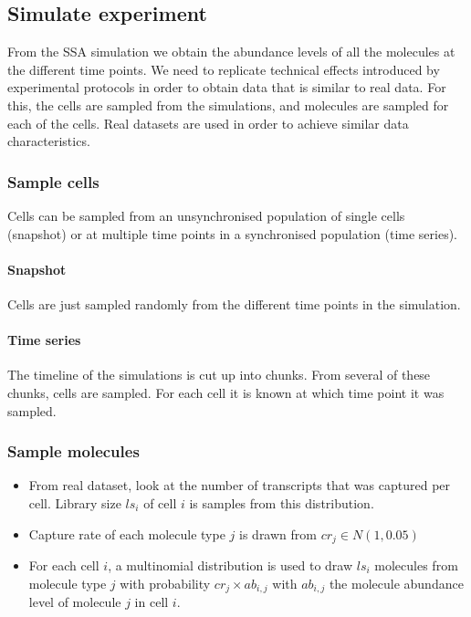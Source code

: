 \subsection{Simulate experiment}
From the SSA simulation we obtain the abundance levels of all the molecules at the different time points. We need to replicate technical effects introduced by experimental protocols in order to obtain data that is similar to real data. For this, the cells are sampled from the simulations, and molecules are sampled for each of the cells. Real datasets are used in order to achieve similar data characteristics.

\subsubsection{Sample cells}
Cells can be sampled from an unsynchronised population of single cells (snapshot) or at multiple time points in a synchronised population (time series).

\paragraph{Snapshot} Cells are just sampled randomly from the different time points in the simulation.

\paragraph{Time series} The timeline of the simulations is cut up into chunks. From several of these chunks, cells are sampled. For each cell it is known at which time point it was sampled.

\subsubsection{Sample molecules} 

\begin{itemize}
	\item From real dataset, look at the number of transcripts that was captured per cell. Library size $ls_i$ of cell $i$ is samples from this distribution.
	\item Capture rate of each molecule type $j$ is drawn from $cr_j \in N(1, 0.05)$
	\item For each cell $i$, a multinomial distribution is used to draw $ls_i$ molecules from molecule type $j$ with probability $cr_j \times ab_{i,j}$ with $ab_{i,j}$ the molecule abundance level of molecule $j$ in cell $i$.
\end{itemize} 

